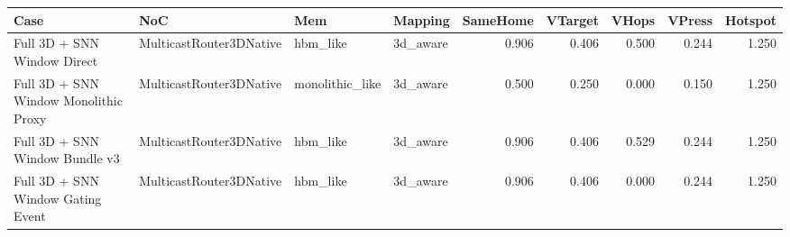 \begin{tabular}{l l l l r r r r r}
\hline
Case & NoC & Mem & Mapping & SameHome & VTarget & VHops & VPress & Hotspot \\
\hline
Full 3D + SNN Window Direct & MulticastRouter3DNative & hbm\_like & 3d\_aware & 0.906 & 0.406 & 0.500 & 0.244 & 1.250 \\
Full 3D + SNN Window Monolithic Proxy & MulticastRouter3DNative & monolithic\_like & 3d\_aware & 0.500 & 0.250 & 0.000 & 0.150 & 1.250 \\
Full 3D + SNN Window Bundle v3 & MulticastRouter3DNative & hbm\_like & 3d\_aware & 0.906 & 0.406 & 0.529 & 0.244 & 1.250 \\
Full 3D + SNN Window Gating Event & MulticastRouter3DNative & hbm\_like & 3d\_aware & 0.906 & 0.406 & 0.000 & 0.244 & 1.250 \\
\hline
\end{tabular}
